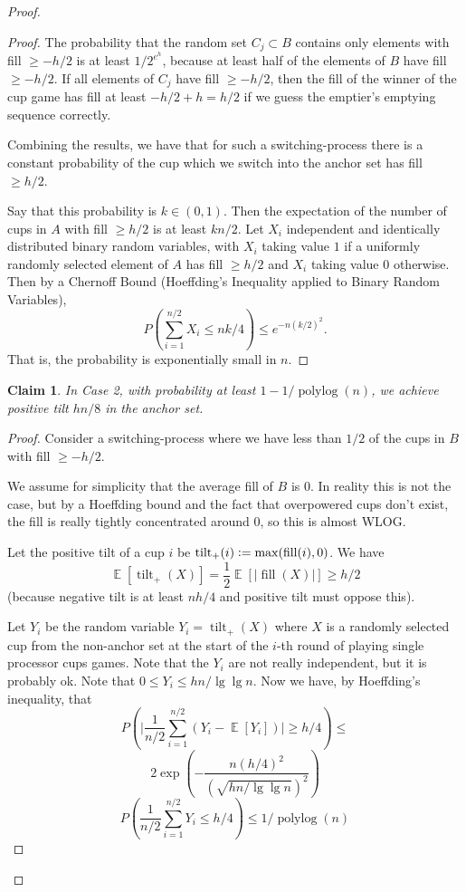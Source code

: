 \documentclass[twocolumn]{article}[11pt]
\DeclareMathOperator{\E}{\mathbb{E}}
\DeclareMathOperator{\polylog}{\text{polylog}}
\DeclareMathOperator{\tilt}{\text{tilt}}
\DeclareMathOperator{\fil}{\text{fill}}
\newcommand{\defeq}{\vcentcolon=}
\newtheorem{clm}{Claim}
\begin{document}
\begin{proof}
\begin{proof}
  The probability that the random set $C_j \subset B$ contains only elements
  with fill $\ge -h/2$ is at least $1/2^{e^h}$, because at least half of the
  elements of $B$ have fill $\ge -h/2$. If all elements of $C_j$ have fill $\ge
  -h/2$, then the fill of the winner of the cup game has fill at least $-h/2 +
  h = h/2$ if we guess the emptier's emptying sequence correctly.

  Combining the results, we have that for such a switching-process there is a
  constant probability of the cup which we switch into the anchor set has fill
  $\ge h/2$. 

  Say that this probability is $k \in (0,1)$. Then the expectation of the
  number of cups in $A$ with fill $ \ge h/2$ is at least $kn/2$. Let $X_i$
  independent and identically distributed binary random variables, with $X_i$
  taking value $1$ if a uniformly randomly selected element of $A$ has fill
  $\ge h/2$ and $X_i$ taking value $0$ otherwise. Then by a Chernoff Bound
  (Hoeffding's Inequality applied to Binary Random Variables),
  $$P\left(\sum_{i=1}^{n/2} X_i\le nk/4\right) \le e^{-n(k/2)^2}.$$ That is,
  the probability is exponentially small in $n$.
\end{proof}

\begin{clm}
  \label{clm:xtreme}
  In Case 2, with probability at least $1- 1/\polylog(n)$, we achieve positive tilt $hn/8$ in the anchor set.
\end{clm}

\begin{proof}
  Consider a switching-process where we have less than $1/2$ of the cups in $B$
  with fill $\ge -h/2$.


  We assume for simplicity that the average fill of $B$ is $0$. In reality this
  is not the case, but by a Hoeffding bound and the fact that overpowered cups don't
  exist, the fill is really tightly concentrated around $0$, so this is almost
  WLOG.

  Let the positive tilt of a cup $i$ be $\tilt_+(i) \defeq \max(\fil(i), 0)$.
  We have
  $$\E[\tilt_+(X)] = \frac{1}{2}\E[|\fil(X)|] \ge h/2$$
  (because negative tilt is at least $nh/4$ and positive tilt must oppose this).
  
  Let $Y_i$ be the random variable $Y_i=\tilt_+(X)$ where $X$ is a randomly
  selected cup from the non-anchor set at the start of the $i$-th round of
  playing single processor cups games. Note that the $Y_i$ are not really
  independent, but it is probably ok. Note that $0\le Y_i \le hn/\lg\lg n$.
  Now we have, by Hoeffding's inequality, that 
  $$P\left(\Big|\frac{1}{n/2} \sum_{i=1}^{n/2} (Y_i - \E[Y_i])\Big|\ge h/4
  \right) \le$$
  $$2\exp\left(-\frac{n(h/4)^2}{(\sqrt{hn/\lg\lg n})^2}\right) $$
  $$P\left(\frac{1}{n/2}\sum_{i=1}^{n/2} Y_i \le h/4\right) \le 1/\polylog(n) $$


\end{proof}
\end{proof}
\end{document}
